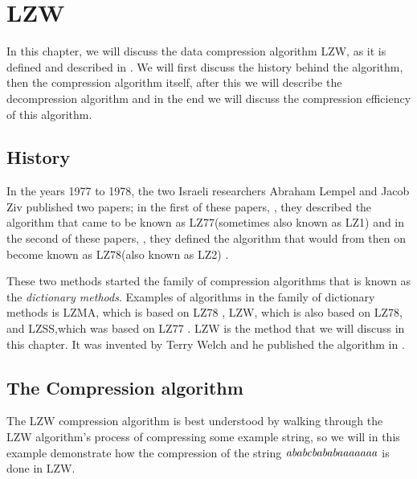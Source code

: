 \begin{comment}
  
\end{comment}

\chapter{LZW}
\label{cha:lzw}

In this chapter, we will discuss the data compression algorithm LZW,
as it is defined and described in
\cite{Nelson:1989:LDC:77102.77104,Welch:1984:THD:1319729.1320134,Salomon:2004:DCC,mark1996data_compression_book,nelson:_lzw_revis}. We
will first discuss the history behind the algorithm, then the
compression algorithm itself, after this we will describe the
decompression algorithm and in the end we will discuss the compression
efficiency of this algorithm.

\section{History}
\label{sec:hist-lzw}

In the years 1977 to 1978, the two Israeli researchers Abraham Lempel
and Jacob Ziv published two papers; in the first of these papers,
\cite{Ziv77auniversal}, they described the algorithm that came to be
known as LZ77(sometimes also known as LZ1) and in the second of these
papers, \cite{Ziv78compressionof}, they defined the algorithm that
would from then on become known as LZ78(also known as LZ2)
\cite{roelofs09:_histor_portab_networ_graph_png_format,Salomon:2004:DCC,winters:_us_paten_adapt}.

These two methods started the family of compression algorithms that is
known as the \textit{dictionary methods}. Examples of algorithms in
the family of dictionary methods is LZMA, which is based on LZ78
\cite{palov11}, LZW, which is also based on LZ78, and LZSS,which was
based on LZ77 \cite{Salomon:2004:DCC}. LZW is the method that we will
discuss in this chapter. It was invented by Terry Welch and he
published the algorithm in \cite{welch85:_u}.

\section{The Compression algorithm}
\label{sec:lzw-comp-desc}

The LZW compression algorithm is best
understood by walking through the LZW algorithm's process of
compressing some example string, so we will in this example
demonstrate how the compression of the string
$\mathit{ababcbababaaaaaaa}$ is done in LZW.

